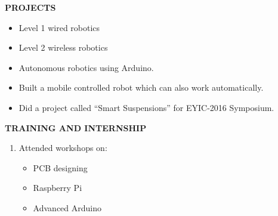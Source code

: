 \documentclass[a4paper]{article}
\begin{document}
\begin{flushleft}
\textbf {PROJECTS}\\
\begin{itemize}
\item	Level 1 wired robotics
\item	Level 2 wireless robotics
\item	Autonomous robotics using Arduino.
\item	Built a  mobile controlled robot which can also work automatically.
\item	Did a project called “Smart Suspensions” for EYIC-2016 Symposium.  
\end{itemize}
\end{flushleft}


\begin{flushleft}
\vspace{2in}
\textbf {TRAINING AND INTERNSHIP}\\
\begin{enumerate}
\item  	Attended workshops on:
\begin{itemize}
 \item PCB designing 
\item  Raspberry Pi
\item Advanced Arduino
\end{itemize}
\end{enumerate}
\end{flushleft}

\begin{flushleft}
\textbf {}
\end{flushleft}
\end{document}
